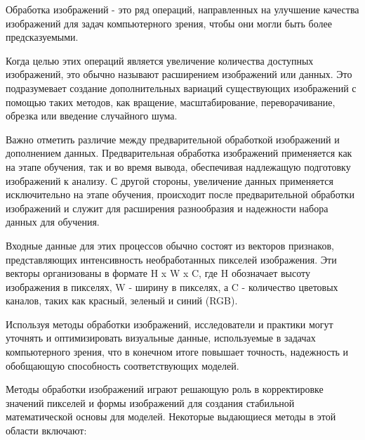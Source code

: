 Обработка изображений - это ряд операций, направленных на улучшение качества изображений для задач компьютерного зрения, чтобы они могли быть более предсказуемыми. 

Когда целью этих операций является увеличение количества доступных изображений, это обычно называют расширением изображений или данных. Это подразумевает создание дополнительных вариаций существующих изображений с помощью таких методов, как вращение, масштабирование, переворачивание, обрезка или введение случайного шума.

Важно отметить различие между предварительной обработкой изображений и дополнением данных. Предварительная обработка изображений применяется как на этапе обучения, так и во время вывода, обеспечивая надлежащую подготовку изображений к анализу. С другой стороны, увеличение данных применяется исключительно на этапе обучения, происходит после предварительной обработки изображений и служит для расширения разнообразия и надежности набора данных для обучения.

Входные данные для этих процессов обычно состоят из векторов признаков, представляющих интенсивность необработанных пикселей изображения. Эти векторы организованы в формате H x W x C, где H обозначает высоту изображения в пикселях, W - ширину в пикселях, а C - количество цветовых каналов, таких как красный, зеленый и синий (RGB).

Используя методы обработки изображений, исследователи и практики могут уточнять и оптимизировать визуальные данные, используемые в задачах компьютерного зрения, что в конечном итоге повышает точность, надежность и обобщающую способность соответствующих моделей.

Методы обработки изображений играют решающую роль в корректировке значений пикселей и формы изображений для создания стабильной математической основы для моделей. Некоторые выдающиеся методы в этой области включают:

